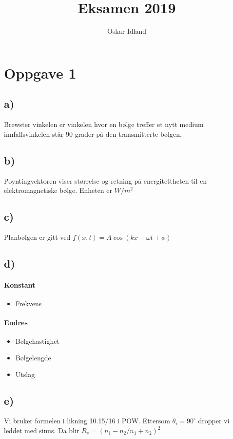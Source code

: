 \documentclass{article}
\author{Oskar Idland}
\title{Eksamen 2019}
\date{}
\begin{document}
\maketitle
\newpage

\section*{Oppgave 1}
  \subsection*{a)}
  Brewster vinkelen er vinkelen hvor en bølge treffer et nytt medium innfallsvinkelen står 90 grader på den transmitterte bølgen. 

  \subsection*{b)}
  Poyntingvektoren viser størrelse og retning på energitettheten til en elektromagnetiske bølge. Enheten er $W / m^2$

\subsection*{c)}
Planbølgen er gitt ved $f(x,t) = A \cos (kx - ωt + ϕ)$

\subsection*{d)}
\paragraph*{Konstant}
\begin{itemize}
    \item Frekvens
\end{itemize}

\paragraph*{Endres}
\begin{itemize}
    \item Bølgehastighet
    \item Bølgelengde 
    \item Utslag 
\end{itemize}

\subsection*{e)}
Vi bruker formelen i likning 10.15/16 i POW. Ettersom $θ_i = 90^{∘}$ dropper vi leddet med sinus. 
Da blir $R_s = \left(n_1 -n_2 / n_1 + n_2\right)^2$
\end{document}

